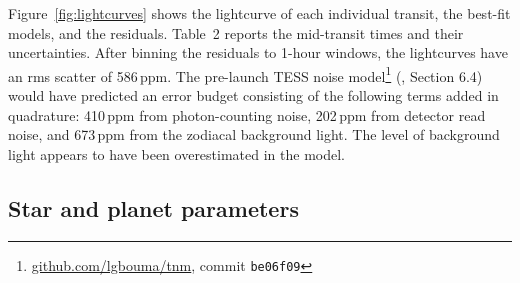 \documentclass[12pt,twocolumn,tighten]{aastex62}
\begin{document}
Figure~\ref{fig:lightcurves} shows the lightcurve of each individual
transit, the best-fit models, and the residuals.  Table~2 reports the
mid-transit times and their uncertainties.  After binning the
residuals to 1-hour windows, the lightcurves have an rms scatter of
586\,{\rm ppm}.  The pre-launch TESS noise
model\footnote{\url{github.com/lgbouma/tnm}, commit \texttt{be06f09}}
(\citealt{winn_photonflux_2013}, \citealt{Sullivan_2015} Section 6.4)
would have predicted an error budget consisting of the following terms
added in quadrature: 410\,{\rm ppm} from photon-counting noise,
202\,{\rm ppm} from detector read noise, and 673\,{\rm ppm} from the
zodiacal background light.  The level of background light appears to
have been overestimated in the model.

\subsection{Star and planet parameters}
\label{sec:system_parameters}
\end{document}
